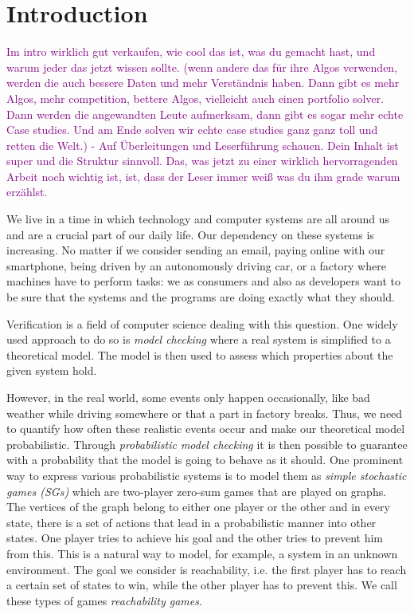 \chapter{Introduction} \label{ch:intro}

\textcolor{purple}{Im intro wirklich gut verkaufen, wie cool das ist, was du gemacht hast, und warum jeder das jetzt wissen sollte. (wenn andere das für ihre Algos verwenden, werden die auch bessere Daten und mehr Verständnis haben. Dann gibt es mehr Algos, mehr competition, bettere Algos, vielleicht auch einen portfolio solver. Dann werden die angewandten Leute aufmerksam, dann gibt es sogar mehr echte Case studies. Und am Ende solven wir echte case studies ganz ganz toll und retten die Welt.)
- Auf Überleitungen und Leserführung schauen. Dein Inhalt ist super und die Struktur sinnvoll. Das, was jetzt zu einer wirklich hervorragenden Arbeit noch wichtig ist, ist, dass der Leser immer weiß was du ihm grade warum erzählst.}

We live in a time in which technology and computer systems are all around us and are a crucial part of our daily life. 
Our dependency on these systems is increasing. 
No matter if we consider sending an email, paying online with our smartphone, being driven by an autonomously driving car, or a factory where machines have to perform tasks: 
we as consumers and also as developers want to be sure that the systems and the programs are doing exactly what they should.

Verification is a field of computer science dealing with this question. 
One widely used approach to do so is \emph{model checking} where a real system is simplified to a theoretical model.
The model is then used to assess which properties about the given system hold.

However, in the real world, some events only happen occasionally, like bad weather while driving somewhere or that a part in factory breaks. 
Thus, we need to quantify how often these realistic events occur and make our theoretical model probabilistic. 
Through \emph{probabilistic model checking} it is then possible to guarantee with a probability that the model is going to behave as it should. 
One prominent way to express various probabilistic systems is to model them as \emph{simple stochastic games (SGs)} which are two-player zero-sum games that are played on graphs. 
The vertices of the graph belong to either one player or the other and in every state, there is a set of actions that lead in a probabilistic manner into other states. 
One player tries to achieve his goal and the other tries to prevent him from this. This is a natural way to model, for example, a system in an unknown environment.
The goal we consider is reachability, i.e. the first player has to reach a certain set of states to win, while the other player has to prevent this. 
We call these types of games \emph{reachability games}.

